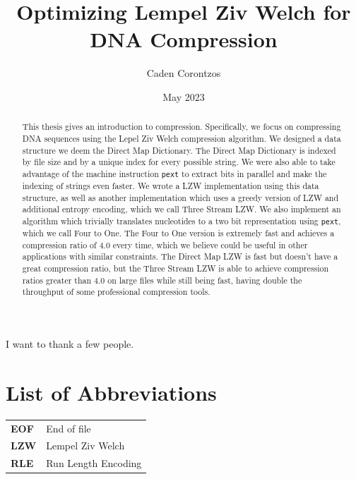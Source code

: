 \documentclass[12pt,twoside]{reedthesis}
\title{Optimizing Lempel Ziv Welch for DNA Compression}
\author{Caden Corontzos}
\date{May 2023}
\begin{document}
  \maketitle

\frontmatter %
\pagestyle{empty} %
  \begin{acknowledgements}
    I want to thank a few people.
  \end{acknowledgements}

\chapter*{List of Abbreviations}
\begin{table}[h]
    \centering
    \begin{tabular}{ll}
                \textbf{EOF} & End of file \\
                \textbf{LZW} & Lempel Ziv Welch \\
                \textbf{RLE} & Run Length Encoding \\
            \end{tabular}
\end{table}
  \hypersetup{linkcolor=black}
  \setcounter{secnumdepth}{2}
  \setcounter{tocdepth}{2}
  \tableofcontents

  \listoftables

  \listoffigures
  \begin{abstract}
    This thesis gives an introduction to compression. Specifically, we focus on compressing DNA sequences using the Lepel Ziv Welch compression algorithm. We designed a data structure we deem the Direct Map Dictionary. The Direct Map Dictionary is indexed by file size and by a unique index for every possible string. We were also able to take advantage of the machine instruction \texttt{pext} to extract bits in parallel and make the indexing of strings even faster. We wrote a LZW implementation using this data structure, as well as another implementation which uses a greedy version of LZW and additional entropy encoding, which we call Three Stream LZW. We also implement an algorithm which trivially translates nucleotides to a two bit representation using \texttt{pext}, which we call Four to One. The Four to One version is extremely fast and achieves a compression ratio of 4.0 every time, which we believe could be useful in other applications with similar constraints. The Direct Map LZW is fast but doesn't have a great compression ratio, but the Three Stream LZW is able to achieve compression ratios greater than 4.0 on large files while still being fast, having double the throughput of some professional compression tools.
  \end{abstract}
\end{document}
